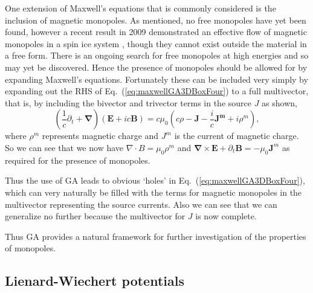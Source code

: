 \documentclass[12pt,aps,prb,preprint]{revtex4}   %
\newcommand{\be}{\begin{equation}}
\newcommand{\ee}{\end{equation}}
\newcommand{\iGA}{{i}}
\begin{document}
One extension of Maxwell's equations that is commonly considered is the inclusion of magnetic monopoles. As mentioned, no free monopoles have yet been found, however a recent result in 2009 demonstrated an effective flow of magnetic monopoles in a spin ice system \cite{monopoles:2009}, though they cannot exist outside the material in a free form. There is an ongoing search for free monopoles at high energies \cite{Cozzi2006} and so may yet be discovered. Hence the presence of monopoles should be allowed for by expanding Maxwell's equations.
Fortunately these can be included very simply by expanding out the RHS of Eq.~(\ref{eq:maxwellGA3DBoxFour}) to a full multivector, that is, by including the bivector and trivector terms in the source $ J $ as shown,
\be \label{eq:maxwellGASISimpleFinalMagneticMonopoles}
(\frac{1}{c} \partial_t + \mathbf{\nabla}) ( \mathbf{E} + \iGA c \mathbf{B}) =  c \mu_0 ( c \rho - \mathbf{J}  - \frac{\iGA}{c} \mathbf{J^m} + \iGA \rho^m  ) ,   
\ee
where $ \rho^m $ represents magnetic charge and $ J^m $ is the current of magnetic charge.
So we can see that we now have $ \nabla \cdot B =  \mu_0 \rho^m $ and $ \mathbf{\nabla} \times \mathbf{E} +  \partial_t \mathbf{B} = - \mu_0 \textbf{J}^m $ as required for the presence of monopoles.  

Thus the use of GA leads to obvious `holes' in Eq.~(\ref{eq:maxwellGA3DBoxFour}),  which can very naturally be filled with the terms for magnetic monopoles in the multivector representing the source currents.  Also we can see that we can generalize no further because the multivector for $ J $ is now complete.

Thus GA provides a natural framework for further investigation of the properties of monopoles.



\subsection{Lienard-Wiechert potentials}
\end{document}
